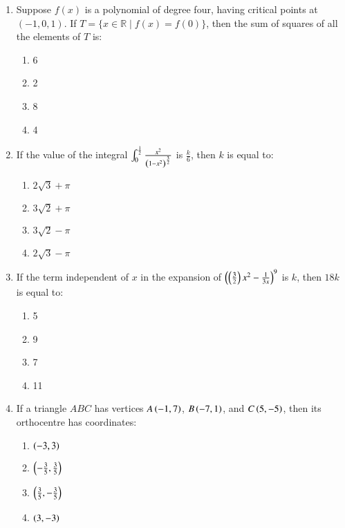 \documentclass[journal,9pt,twocolumn]{IEEEtran}
\begin{document}
\begin{enumerate}
\item Suppose $f(x)$ is a polynomial of degree four, having critical points at $(-1, 0, 1)$. If $T = \{ x \in \mathbb{R} \mid f(x) = f(0) \}$, then the sum of squares of all the elements of $T$ is:
        \begin{multicols}{4}

\begin{enumerate}
    \item 6
    \item 2
    \item 8
    \item 4
\end{enumerate}
\end{multicols}

\item If the value of the integral $ \int_{0}^{\frac{1}{2}} \frac{x^2}{\left(1 - x^2\right)^{\frac{3}{2}}}$ is $\frac{k}{6}$, then $k$ is equal to:
        
        \begin{multicols}{2}
\begin{enumerate}
    \item $2\sqrt{3} + \pi$
    \item $3\sqrt{2} + \pi$
    \item $3\sqrt{2} - \pi$
    \item $2\sqrt{3} - \pi$
\end{enumerate}
\end{multicols}

 \item If the term independent of $x$ in the expansion of $\left( \left( \frac{3}{2} \right) x^2 - \frac{1}{3x} \right)^9$ is $k$, then $18k$ is equal to:
        \begin{multicols}{4}

\begin{enumerate}
    \item 5
    \item 9
    \item 7
    \item 11
\end{enumerate}
\end{multicols}

\item If a triangle $ABC$ has vertices $A\left(-1, 7\right)$, $B\left(-7, 1\right)$, and $C\left(5, -5\right)$, then its orthocentre has coordinates:
        \begin{multicols}{2}

\begin{enumerate}
    \item $\left(-3, 3\right)$
    \item $\left(-\frac{3}{5}, \frac{3}{5}\right)$
    \item $\left(\frac{3}{5}, -\frac{3}{5}\right)$
    \item $\left(3, -3\right)$
\end{enumerate}
\end{multicols}


\end{enumerate}
\end{document}
